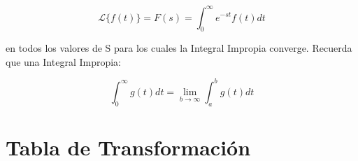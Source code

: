 \documentclass[12pt]{report}                                %
\begin{document}
        \begin{equation}   
            \mathscr{L}\{f(t)\} = F(s) = \int_0^\infty e^{-st} f(t) dt 
        \end{equation}    


        en todos los valores de S para los cuales la Integral Impropia converge.
        Recuerda que una Integral Impropia:

        \begin{equation*}   
            \int_0^\infty g(t) dt = \lim_{b \to \infty} \int_a^b g(t) dt
        \end{equation*}  


    \clearpage
    \section{Tabla de Transformación}
\end{document}
